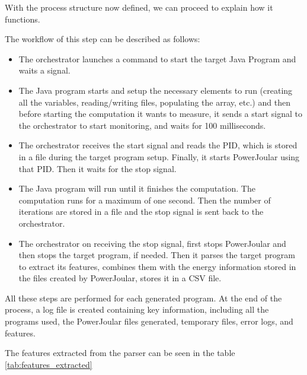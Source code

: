With the process structure now defined, we can proceed to explain how it functions.

The workflow of this step can be described as follows:

\begin{itemize}
  \item The orchestrator launches a command to start the target Java Program and waits a signal.
  \item The Java program starts and setup the necessary elements to run (creating all the variables, reading/writing files, populating the array, etc.) and then before starting the computation it wants to measure, it sends a start signal to the orchestrator to start monitoring, and waits for 100 milliseconds.
  \item The orchestrator receives the start signal and reads the PID, which is stored in a file during the target program setup. Finally, it starts PowerJoular using that PID. Then it waits for the stop signal.
  \item The Java program will run until it finishes the computation. The computation runs for a maximum of one second. Then the number of iterations are stored in a file and the stop signal is sent back to the orchestrator.
  \item The orchestrator on receiving the stop signal, first stops PowerJoular and then stops the target program, if needed. Then it parses the target program to extract its features, combines them with the energy information stored in the files created by PowerJoular, stores it in a CSV file.
\end{itemize}

All these steps are performed for each generated program. At the end of the process, a log file is created containing key information, including all the programs used, the PowerJoular files generated, temporary files, error logs, and features.

The features extracted from the parser can be seen in the table \ref{tab:features_extracted}

